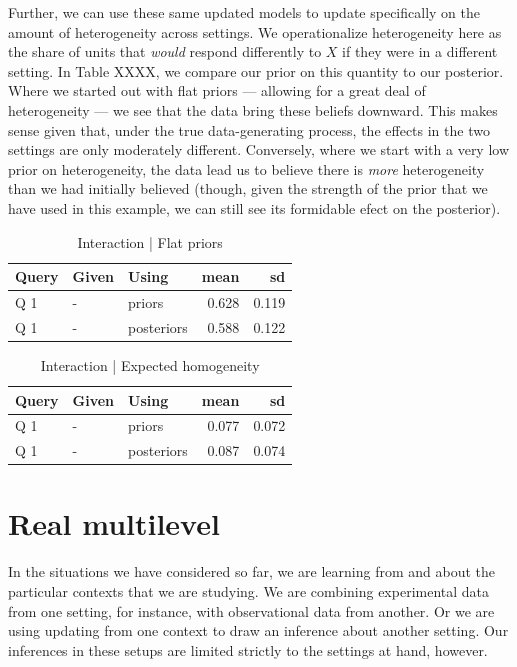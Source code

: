 \documentclass[
  12pt,
]{book}
\begin{document}
Further, we can use these same updated models to update specifically on the amount of heterogeneity across settings. We operationalize heterogeneity here as the share of units that \emph{would} respond differently to \(X\) if they were in a different setting. In Table XXXX, we compare our prior on this quantity to our posterior. Where we started out with flat priors --- allowing for a great deal of heterogeneity --- we see that the data bring these beliefs downward. This makes sense given that, under the true data-generating process, the effects in the two settings are only moderately different. Conversely, where we start with a very low prior on heterogeneity, the data lead us to believe there is \emph{more} heterogeneity than we had initially believed (though, given the strength of the prior that we have used in this example, we can still see its formidable efect on the posterior).

\begin{table}

\caption{\label{tab:unnamed-chunk-11}Interaction | Flat priors}
\centering
\begin{tabular}[t]{l|l|l|r|r}
\hline
Query & Given & Using & mean & sd\\
\hline
Q 1 & - & priors & 0.628 & 0.119\\
\hline
Q 1 & - & posteriors & 0.588 & 0.122\\
\hline
\end{tabular}
\end{table}

\begin{table}

\caption{\label{tab:unnamed-chunk-11}Interaction | Expected homogeneity}
\centering
\begin{tabular}[t]{l|l|l|r|r}
\hline
Query & Given & Using & mean & sd\\
\hline
Q 1 & - & priors & 0.077 & 0.072\\
\hline
Q 1 & - & posteriors & 0.087 & 0.074\\
\hline
\end{tabular}
\end{table}

\hypertarget{real-multilevel}{%
\section{Real multilevel}\label{real-multilevel}}

In the situations we have considered so far, we are learning from and about the particular contexts that we are studying. We are combining experimental data from one setting, for instance, with observational data from another. Or we are using updating from one context to draw an inference about another setting. Our inferences in these setups are limited strictly to the settings at hand, however.
\end{document}
